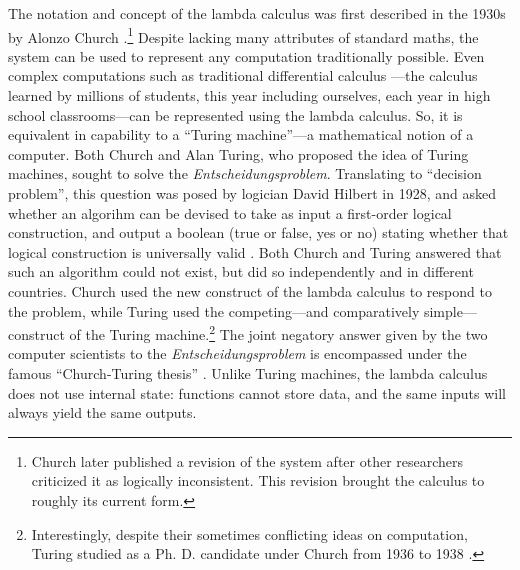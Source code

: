 \documentclass[twocolumn,titlepage,12pt]{article}
\begin{document}
The notation and concept of the lambda calculus was first described in the 1930s by Alonzo Church \cite{church}.\footnote{Church later published a revision \cite{church2} of the system after other researchers\cite{logicallyinconsistent} criticized it as logically inconsistent. This revision brought the calculus to roughly its current form.} Despite lacking many attributes of standard maths, the system can be used to represent any computation traditionally possible. Even complex computations such as traditional differential calculus \cite{differentiallc}---the calculus learned by millions of students, this year including ourselves, each year in high school classrooms---can be represented using the lambda calculus. So, it is equivalent in capability to a ``Turing machine''---a mathematical notion of a computer. Both Church and Alan Turing, who proposed the idea of Turing machines, sought to solve the \textit{Entscheidungsproblem}. Translating to ``decision problem'', this question was posed by logician David Hilbert in 1928, and asked whether an algorihm can be devised to take as input a first-order logical construction, and output a boolean (true or false, yes or no) stating whether that logical construction is universally valid \cite{hilbert}. Both Church and Turing answered that such an algorithm could not exist, but did so independently and in different countries. Church used the new construct of the lambda calculus to respond to the problem, while Turing used the competing---and comparatively simple---construct of the Turing machine.\footnote{Interestingly, despite their sometimes conflicting ideas on computation, Turing studied as a Ph. D. candidate under Church from 1936 to 1938 \cite{churchpapers}.} The joint negatory answer given by the two computer scientists to the \textit{Entscheidungsproblem} is encompassed under the famous ``Church-Turing thesis'' \cite{churchturingthesis}. Unlike Turing machines, the lambda calculus does not use internal state: functions cannot store data, and the same inputs will always yield the same outputs.
\end{document}
